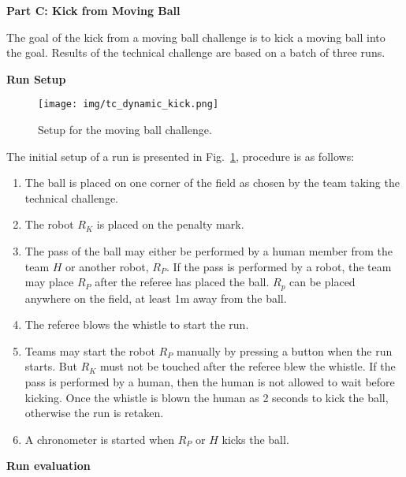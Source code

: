 \clearpage
\sffamily
{\bfseries\color[rgb]{0.4,0.4,0.4}
Part C: Kick from Moving Ball}
{}


\bigskip

The goal of the kick from a moving ball challenge is to kick a moving ball
into the goal. Results of the technical challenge are based on a batch of three runs.

\bigskip

{\bfseries Run Setup}

\smallskip

\begin{figure}[h]
\begin{center}
\texttt{[image: img/tc\_dynamic\_kick.png]}
\caption{\label{fig:tc_dynamic_kick}Setup for the moving ball challenge.}
\end{center}
\end{figure}

The initial setup of a run is presented in Fig.~\ref{fig:tc_dynamic_kick},
procedure is as follows:


\begin{enumerate}
\item The ball is placed on one corner of the field as chosen by the team taking the
technical challenge.
\item The robot $R_K$ is placed on the penalty mark.
\item The pass of the ball may either be performed by a human member from the
team $H$ or another robot, $R_P$. If the pass is performed by a robot, the team
may place $R_P$ after the referee has placed the ball. $R_p$ can be placed
anywhere on the field, at least 1m away from the ball.
\item The referee blows the whistle to start the run.
\item Teams may start the robot $R_P$ manually by pressing a button when the
run starts. But $R_K$ must not be touched after the referee blew the whistle. If
the pass is performed by a human, then the human is not allowed to wait before
kicking. Once the whistle is blown the human as 2 seconds to kick the ball,
otherwise the run is retaken.
\item A chronometer is started when $R_P$ or $H$ kicks the ball.
\end{enumerate}

{\bfseries Run evaluation}


